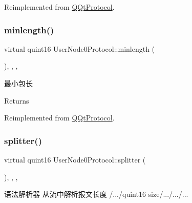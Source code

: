 Reimplemented from \mbox{\hyperlink{class_q_qt_protocol_af41bc3116abbbcfc9af45e151a253ff7}{Q\+Qt\+Protocol}}.

\mbox{\label{class_user_node0_protocol_a70125c71f69baed9ac977efd92591227}} 
\subsubsection{\texorpdfstring{minlength()}{minlength()}}
{\footnotesize\ttfamily virtual quint16 User\+Node0\+Protocol\+::minlength (\begin{DoxyParamCaption}{ }\end{DoxyParamCaption})\hspace{0.3cm}{\ttfamily [inline]}, {\ttfamily [override]}, {\ttfamily [protected]}, {\ttfamily [virtual]}}



最小包长 

\begin{DoxyReturn}{Returns}

\end{DoxyReturn}


Reimplemented from \mbox{\hyperlink{class_q_qt_protocol_a2b00f53d3dd0eed817eeecff422891f3}{Q\+Qt\+Protocol}}.

\mbox{\label{class_user_node0_protocol_a37557b8ee540a09b33591f203555e69c}} 
\subsubsection{\texorpdfstring{splitter()}{splitter()}}
{\footnotesize\ttfamily virtual quint16 User\+Node0\+Protocol\+::splitter (\begin{DoxyParamCaption}\item[{const Q\+Byte\+Array \&}]{ }\end{DoxyParamCaption})\hspace{0.3cm}{\ttfamily [inline]}, {\ttfamily [override]}, {\ttfamily [protected]}, {\ttfamily [virtual]}}



语法解析器 从流中解析报文长度 /.../quint16 size/.../.../... 


